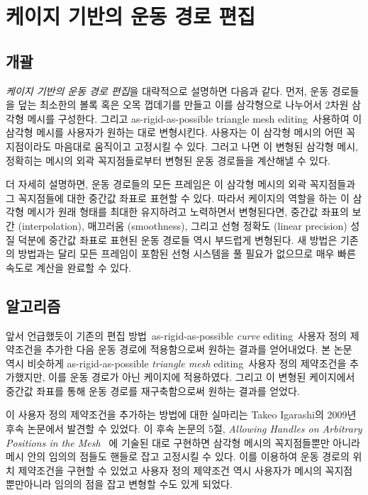 \documentclass[12pt,a4paper,oneside,final]{report}
\newcommand{\Kim}{\cite{Kim:2009:SMM:1531326.1531385}}
\newcommand{\Igarashi}{\cite{Igarashi:2005:ASM:1073204.1073323}}
\begin{document}
\chapter{케이지 기반의 운동 경로 편집}
\section{개괄}
\emph{케이지 기반의 운동 경로 편집}을 대략적으로 설명하면 다음과 같다.
먼저, 운동 경로들을 덮는 최소한의 볼록 혹은 오목 껍데기를 만들고 이를
삼각형으로 나누어서 2차원 삼각형 메시를 구성한다. 그리고 as-rigid-as-possible
triangle mesh editing~ 사용하여 이 삼각형 메시를 사용자가 원하는
대로 변형시킨다. 사용자는 이 삼각형 메시의 어떤 꼭지점이라도 마음대로 움직이고
고정시킬 수 있다. 그러고 나면 이 변형된 삼각형 메시, 정확히는 메시의 외곽
꼭지점들로부터 변형된 운동 경로들을 계산해낼 수 있다.

더 자세히 설명하면, 운동 경로들의 모든 프레임은 이 삼각형 메시의 외곽
꼭지점들과 그 꼭지점들에 대한 중간값 좌표로 표현할 수 있다. 따라서 케이지의
역할을 하는 이 삼각형 메시가 원래 형태를 최대한 유지하려고 노력하면서
변형된다면, 중간값 좌표의 보간 (interpolation), 매끄러움 (smoothness), 그리고
선형 정확도 (linear precision) 성질 덕분에 중간값 좌표로 표현된 운동 경로들
역시 부드럽게 변형된다. 새 방법은 기존의 방법과는 달리 모든 프레임이 포함된
선형 시스템을 풀 필요가 없으므로 매우 빠른 속도로 계산을 완료할 수 있다.

\section{알고리즘}
앞서 언급했듯이 기존의 편집 방법~ as-rigid-as-possible \emph{curve}
editing~ 사용자 정의 제약조건을 추가한 다음 운동 경로에 적용함으로써
원하는 결과를 얻어내었다.  본 논문 역시 비슷하게 as-rigid-as-possible
\emph{triangle mesh} editing~ 사용자 정의 제약조건을 추가했지만,
이를 운동 경로가 아닌 케이지에 적용하였다. 그리고 이 변형된 케이지에서 중간값
좌표를 통해 운동 경로를 재구축함으로써 원하는 결과를 얻었다.

이 사용자 정의 제약조건을 추가하는 방법에 대한 실마리는 Takeo Igarashi의 2009년
후속 논문에서 발견할 수 있었다. 이 후속 논문의 5절, \emph{Allowing Handles on
Arbitrary Positions in the
Mesh}~\cite[p.26]{doi:10.1080/2151237X.2009.10129273} 에 기술된 대로 구현하면
삼각형 메시의 꼭지점들뿐만 아니라 메시 안의 임의의 점들도 핸들로 잡고 고정시킬
수 있다.  이를 이용하여 운동 경로의 위치 제약조건을 구현할 수 있었고 사용자
정의 제약조건 역시 사용자가 메시의 꼭지점 뿐만아니라 임의의 점을 잡고 변형할
수도 있게 되었다.
\end{document}
